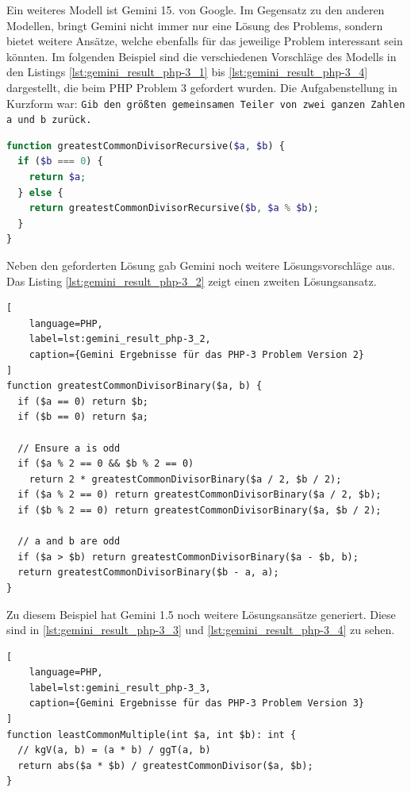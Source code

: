 Ein weiteres Modell ist Gemini 15. von Google. Im Gegensatz zu den anderen Modellen, bringt Gemini nicht immer nur eine Lösung des Problems, sondern bietet weitere Ansätze, welche ebenfalls für das jeweilige Problem interessant sein könnten. Im folgenden Beispiel sind die verschiedenen Vorschläge des Modells in den Listings \ref{lst:gemini_result_php-3_1} bis \ref{lst:gemini_result_php-3_4} dargestellt, die beim PHP Problem 3 gefordert wurden. Die Aufgabenstellung in Kurzform war: \texttt{Gib den größten gemeinsamen Teiler von zwei ganzen Zahlen a und b zurück.}

\begin{lstlisting}[language=PHP,label=lst:gemini_result_php-3_1,caption={Gemini Ergebnis für das PHP-3 Problem Version 1}]
function greatestCommonDivisorRecursive($a, $b) {
  if ($b === 0) {
    return $a;
  } else {
    return greatestCommonDivisorRecursive($b, $a % $b);
  }
}
\end{lstlisting}

Neben den geforderten Lösung gab Gemini noch weitere Lösungsvorschläge aus. Das Listing \ref{lst:gemini_result_php-3_2} zeigt einen zweiten Lösungsansatz.\vspace{0.2cm}

\begin{lstlisting}[
	language=PHP,
	label=lst:gemini_result_php-3_2,
	caption={Gemini Ergebnisse für das PHP-3 Problem Version 2}
]
function greatestCommonDivisorBinary($a, b) {
  if ($a == 0) return $b;
  if ($b == 0) return $a;

  // Ensure a is odd
  if ($a % 2 == 0 && $b % 2 == 0)
    return 2 * greatestCommonDivisorBinary($a / 2, $b / 2);
  if ($a % 2 == 0) return greatestCommonDivisorBinary($a / 2, $b);
  if ($b % 2 == 0) return greatestCommonDivisorBinary($a, $b / 2);

  // a and b are odd
  if ($a > $b) return greatestCommonDivisorBinary($a - $b, b);
  return greatestCommonDivisorBinary($b - a, a);
}
\end{lstlisting}

Zu diesem Beispiel hat Gemini 1.5 noch weitere Lösungsansätze generiert. Diese sind in \ref{lst:gemini_result_php-3_3} und \ref{lst:gemini_result_php-3_4} zu sehen.

\begin{lstlisting}[
	language=PHP,
	label=lst:gemini_result_php-3_3,
	caption={Gemini Ergebnisse für das PHP-3 Problem Version 3}
]
function leastCommonMultiple(int $a, int $b): int {
  // kgV(a, b) = (a * b) / ggT(a, b)
  return abs($a * $b) / greatestCommonDivisor($a, $b);
}
\end{lstlisting}


